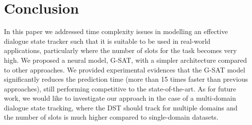 \documentclass{article}
\begin{document}
\section{Conclusion}
\label{sec:conclusion}
In this paper we addressed time complexity issues in modelling an effective dialogue state tracker such that it is suitable to be used in real-world applications, particularly where the number of slots for the task becomes very high.
We proposed a neural model, G-SAT, with a simpler architecture compared to other approaches.
We provided experimental evidences that the G-SAT model significantly reduces the prediction time (more than 15 times faster than previous approaches), still performing competitive to the state-of-the-art.
As for future work, we would like to investigate our approach in the case of a multi-domain dialogue state tracking, where the DST should track for multiple domains and the number of slots is much higher compared to single-domain datasets.



\end{document}
